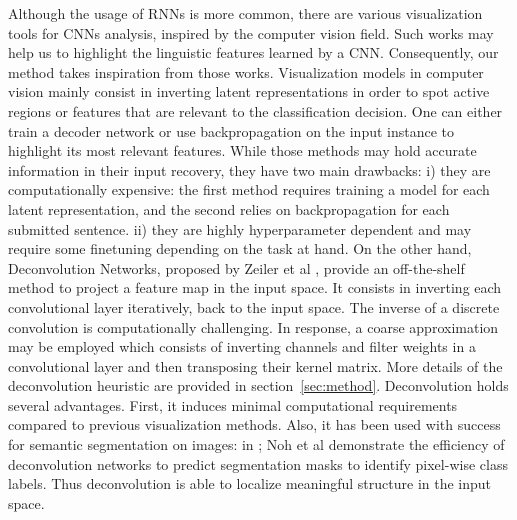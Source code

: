 Although the usage of RNNs is more common, there are various visualization tools for CNNs analysis, 
inspired by the computer vision field. Such works may help us to highlight the linguistic features learned by a 
CNN. Consequently, our method takes inspiration from those works. Visualization models in computer vision mainly consist 
in inverting latent representations in order to spot active regions or features that are relevant to the classification decision.
One can either train a decoder network or use backpropagation on the input instance to highlight its most relevant features. 
While those methods may hold accurate information in their input recovery, they have two main drawbacks: 
i) they are computationally expensive: the first method requires training a model for each latent representation, and the second relies 
on backpropagation for each submitted sentence. ii) they are highly hyperparameter dependent and may require some finetuning depending on the task at hand.
On the other hand, Deconvolution Networks, proposed by Zeiler et al \cite{zeiler2014visualizing}, provide an off-the-shelf method to project a feature map in the input 
space. It consists in inverting each convolutional layer iteratively, back to the input space. The inverse of a discrete convolution is 
computationally challenging. In response, a coarse approximation may be employed which consists of inverting channels and filter weights 
in a convolutional layer and then transposing their kernel matrix. More details of the deconvolution heuristic are provided in section~\ref{sec:method}.
Deconvolution holds several advantages. First, it induces minimal computational requirements compared to previous visualization methods. 
Also, it has been used with success for semantic segmentation on images: in \cite{noh2015learning}; Noh et al demonstrate the efficiency of deconvolution networks 
to predict segmentation masks to identify pixel-wise class labels. Thus deconvolution is able to localize meaningful structure in the input space.

